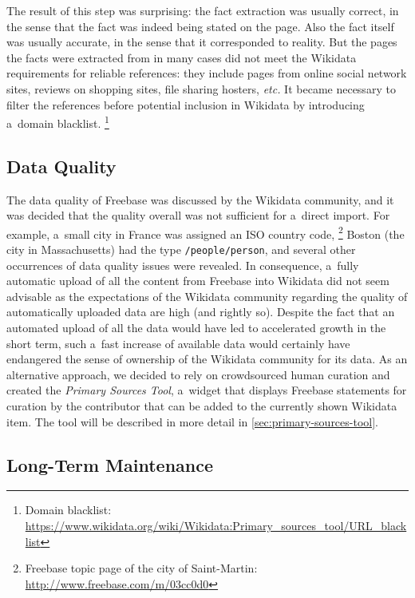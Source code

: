 \documentclass{sig-alternate-2013}
\begin{document}
The result of this step was surprising:
the fact extraction was usually correct, in the sense that the fact was indeed being stated on the page.
Also the fact itself was usually accurate, in the sense that it corresponded to reality.
But the pages the facts were extracted from in many cases did not meet
the Wikidata requirements for reliable references:
they include pages from online social network sites, reviews on shopping sites, file sharing hosters, \emph{etc.}
It became necessary to filter the references before potential inclusion in Wikidata
by introducing a~domain blacklist.%
\footnote{Domain blacklist:
\url{https://www.wikidata.org/wiki/Wikidata:Primary_sources_tool/URL_blacklist}}

\subsection{Data Quality}
\label{sec:dataquality}

The data quality of Freebase was discussed by the Wikidata community, and it
was decided that the quality overall was not sufficient for a~direct import.
For example, a~small city in France was assigned an ISO country code,%
\footnote{Freebase topic page of the city of Saint-Martin: \url{http://www.freebase.com/m/03cc0d0}}
Boston (the city in Massachusetts) had the type \texttt{/people/person},
and several other occurrences of data quality issues were revealed.
In consequence, a~fully automatic upload of all the content from Freebase into Wikidata
did not seem advisable as the expectations of the Wikidata community regarding the
quality of automatically uploaded data are high (and rightly so).
Despite the fact that an automated upload of all the data
would have led to accelerated growth in the short term,
such a~fast increase of available data would certainly have endangered
the sense of ownership of the Wikidata community for its data.
As an alternative approach, we decided to rely on crowdsourced human curation
and created the \emph{Primary Sources Tool},
a~widget that displays Freebase statements
for curation by the contributor that can be added to the currently shown Wikidata item.
The tool will be described in more detail in \autoref{sec:primary-sources-tool}.

\subsection{Long-Term Maintenance}
\label{sec:longtermmaintenance}
\end{document}
